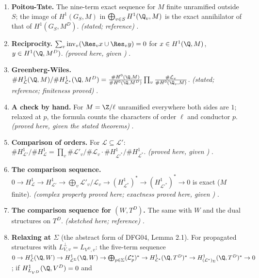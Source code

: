 \begin{sloppypar}
\begin{enumerate}[label=\textbf{\thechapter.\arabic*}]
$\operatorname{corank}H^1_{\mathcal L}(\Q,W)=\dim H^1_{L_V}(\Q,V)$. \emph{(proved here, given ; the corank formula stated)} .
\item \textbf{Poitou-Tate.} The nine-term exact sequence for $M$ finite unramified outside $S$; the image of $H^1(G_S,M)$ in $\bigoplus_{v\in S}H^1(\Q_v,M)$ is the exact annihilator of
that of $H^1(G_S,M^D)$. \emph{(stated; reference)} .
\item \textbf{Reciprocity.} $\sum_v\operatorname{inv}_v(\Res_vx\cup\Res_vy)=0$ for $x\in H^1(\Q,M)$, $y\in H^1(\Q,M^D)$. \emph{(proved here, given )} .
\item \textbf{Greenberg-Wiles.} $\#H^1_{\mathcal L}(\Q,M)/\#H^1_{\mathcal L^*}(\Q,M^D)=\frac{\#H^0(\Q,M)}{\#H^0(\Q,M^D)}\prod_v\frac{\#\mathcal L_v}{\#H^0(\Q_v,M)}$. \emph{(stated; reference; finiteness proved)}
.
\item \textbf{A check by hand.} For $M=\Z/\ell$ unramified everywhere both sides are $1$; relaxed at $p$, the formula counts the characters of order $\ell$ and conductor $p$.
\emph{(proved here, given the stated theorems)} .
\item \textbf{Comparison of orders.} For $\mathcal L\subseteq\mathcal L'$: $\#H^1_{\mathcal L'}/\#H^1_{\mathcal L}=\prod_v\#\mathcal L'_v/\#\mathcal L_v\cdot\#H^1_{\mathcal L'^*}/\#H^1_{\mathcal L^*}$. \emph{(proved here, given
)} .
\item \textbf{The comparison sequence.} $0\to H^1_{\mathcal L}\to H^1_{\mathcal L'}\to\bigoplus_v\mathcal L'_v/\mathcal L_v\to(H^1_{\mathcal L^*})^*\to(H^1_{\mathcal L'^*})^*\to0$ is exact ($M$ finite). \emph{(complex property
proved here; exactness proved here, given )} .
\item \textbf{The comparison sequence for $(W,T^D)$.} The same with $W$ and the dual structures on $T^D$. \emph{(sketched here; reference)} .
\item \textbf{Relaxing at $\Sigma$} (the abstract form of DFG04, Lemma 2.1). For propagated structures with $L_{V,v}^\perp=L_{V^D,v}$: the five-term sequence
$0\to H^1_{\mathcal L}(\Q,W)\to H^1_{\mathcal L^\Sigma}(\Q,W)\to\bigoplus_{p\in\Sigma}(\mathcal L^*_p)^*\to H^1_{\mathcal L^*}(\Q,T^D)^*\to H^1_{(\mathcal L^*)_\Sigma}(\Q,T^D)^*\to0$; if $H^1_{L_{V^D}}(\Q,V^D)=0$ and

\end{enumerate}
\end{sloppypar}
